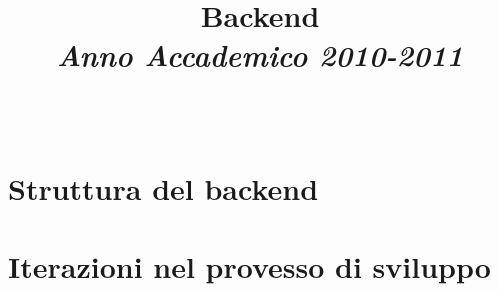 \documentclass[10pt, draft]{book}
\title{Backend\\[2mm]{\small\emph{Anno Accademico 2010-2011}}\\[4mm]}
\author{\Nome\ \Cognome}
\begin{document}
\maketitle

\tableofcontents

\chapter{Struttura del backend}
\chapter{Iterazioni nel provesso di sviluppo}

\printindex
\end{document}
